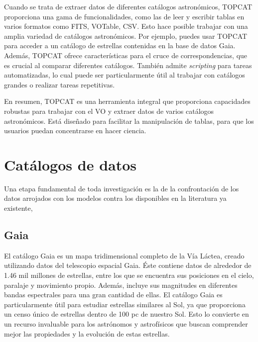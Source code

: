Cuando se trata de extraer datos de diferentes catálogos astronómicos, TOPCAT proporciona una gama de funcionalidades, como las de leer y escribir tablas en varios formatos como FITS, VOTable, CSV. Esto hace posible trabajar con una amplia variedad de catálogos astronómicos. Por ejemplo, puedes usar TOPCAT para acceder a un catálogo de estrellas contenidas en la base de datos Gaia. Además, TOPCAT ofrece características para el cruce de correspondencias, que es crucial al comparar diferentes catálogos. También admite \textit{scripting} para tareas automatizadas, lo cual puede ser particularmente útil al trabajar con catálogos grandes o realizar tareas repetitivas.\par

En resumen, TOPCAT es una herramienta integral que proporciona capacidades robustas para trabajar con el VO y extraer datos de varios catálogos astronómicos. Está diseñado para facilitar la manipulación de tablas, para que los usuarios puedan concentrarse en hacer ciencia.\par

\section{Catálogos de datos}
Una etapa fundamental de toda investigación es la de la confrontación de los datos arrojados con los modelos contra los disponibles en la literatura ya existente,

\subsection{Gaia}
El catálogo Gaia es un mapa tridimensional completo de la Vía Láctea, creado utilizando datos del telescopio espacial Gaia. Éste contiene datos de alrededor de 1.46 mil millones de estrellas, entre los que se encuentra sus posiciones en el cielo, paralaje y movimiento propio. Además, incluye sus magnitudes en diferentes bandas espectrales para una gran cantidad de ellas. El catálogo Gaia es particularmente útil para estudiar estrellas similares al Sol, ya que proporciona un censo único de estrellas dentro de 100 pc de nuestro Sol. Esto lo convierte en un recurso invaluable para los astrónomos y astrofísicos que buscan comprender mejor las propiedades y la evolución de estas estrellas.\par

